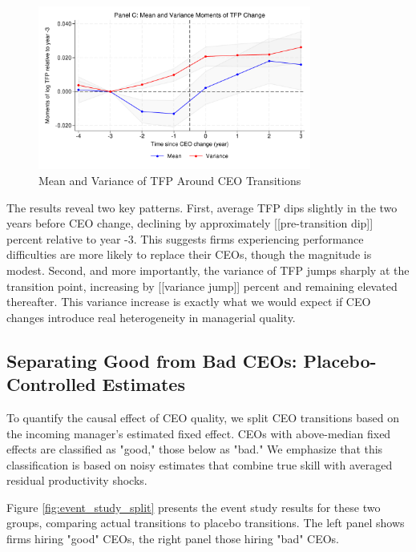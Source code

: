 \documentclass[11pt,a4paper]{article}
\begin{document}
\begin{figure}[htbp]
\centering
\includegraphics[width=0.8\textwidth]{figure/event_study_panel_c.pdf}
\caption{Mean and Variance of TFP Around CEO Transitions}
\label{fig:event_study_combined}
\end{figure}

The results reveal two key patterns. First, average TFP dips slightly in the two years before CEO change, declining by approximately [[pre-transition dip]] percent relative to year -3. This suggests firms experiencing performance difficulties are more likely to replace their CEOs, though the magnitude is modest. Second, and more importantly, the variance of TFP jumps sharply at the transition point, increasing by [[variance jump]] percent and remaining elevated thereafter. This variance increase is exactly what we would expect if CEO changes introduce real heterogeneity in managerial quality.

\subsection{Separating Good from Bad CEOs: Placebo-Controlled Estimates}

To quantify the causal effect of CEO quality, we split CEO transitions based on the incoming manager's estimated fixed effect. CEOs with above-median fixed effects are classified as "good," those below as "bad." We emphasize that this classification is based on noisy estimates that combine true skill with averaged residual productivity shocks.

Figure \ref{fig:event_study_split} presents the event study results for these two groups, comparing actual transitions to placebo transitions. The left panel shows firms hiring "good" CEOs, the right panel those hiring "bad" CEOs.
\end{document}
